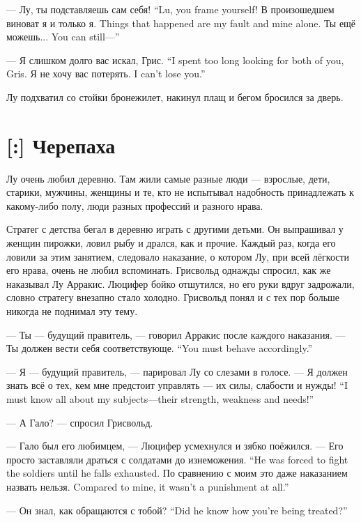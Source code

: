 {--- Лу, ты подставляешь сам себя!}
{``Lu, you frame yourself!}
{В произошедшем виноват я и только я.}
{Things that happened are my fault and mine alone.}
{Ты ещё можешь...}
{You can still---''}

{--- Я слишком долго вас искал, Грис.}
{``I spent too long looking for both of you, Gris.}
{Я не хочу вас потерять.}
{I can't lose you.''}

Лу подхватил со стойки бронежилет, накинул плащ и бегом бросился за дверь.

\section{[:] Черепаха}

\textspace

Лу очень любил деревню.
Там жили самые разные люди --- взрослые, дети, старики, мужчины, женщины и те, кто не испытывал надобность принадлежать к какому-либо полу, люди разных профессий и разного нрава.

Стратег с детства бегал в деревню играть с другими детьми.
Он выпрашивал у женщин пирожки, ловил рыбу и дрался, как и прочие.
Каждый раз, когда его ловили за этим занятием, следовало наказание, о котором Лу, при всей лёгкости его нрава, очень не любил вспоминать.
Грисвольд однажды спросил, как же наказывал Лу Арракис.
Люцифер бойко отшутился, но его руки вдруг задрожали, словно стратегу внезапно стало холодно.
Грисвольд понял и с тех пор больше никогда не поднимал эту тему.

--- Ты --- будущий правитель, --- говорил Арракис после каждого наказания.
{--- Ты должен вести себя соответствующе.}
{``You must behave accordingly.''}

--- Я --- будущий правитель, --- парировал Лу со слезами в голосе.
{--- Я должен знать всё о тех, кем мне предстоит управлять --- их силы, слабости и нужды!}
{``I must know all about my subjects---their strength, weakness and needs!''}

--- А Гало? --- спросил Грисвольд.

--- Гало был его любимцем, --- Люцифер усмехнулся и зябко поёжился.
{--- Его просто заставляли драться с солдатами до изнеможения.}
{``He was forced to fight the soldiers until he falls exhausted.}
{По сравнению с моим это даже наказанием назвать нельзя.}
{Compared to mine, it wasn't a punishment at all.''}

{--- Он знал, как обращаются с тобой?}
{``Did he know how you're being treated?''}

